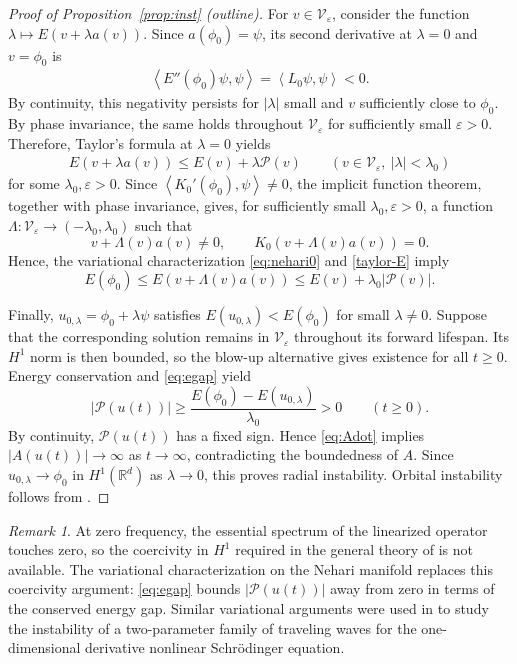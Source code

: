 \documentclass[12pt, a4paper, reqno]{amsart}
\numberwithin{equation}{section}
\theoremstyle{definition}
\theoremstyle{remark}
\newtheorem{remark}[theorem]{Remark}
\newcommand{\R}{\mathbb R}
\def\tbra[#1,#2]{{\left\langle #1,#2\right\rangle}}
\begin{document}
\begin{proof}[Proof of Proposition~\ref{prop:inst} (outline)]
For $v\in\mathcal V_\varepsilon$, consider the function
$\lambda\mapsto E(v+\lambda a(v))$.
Since $a(\phi_0)=\psi$, its second derivative at $\lambda=0$ and
$v=\phi_0$ is
\begin{align*}
\tbra[E''(\phi_0)\psi,\psi]=\tbra[L_0\psi,\psi]<0.
\end{align*}
By continuity, this negativity persists for $|\lambda|$ small and
$v$ sufficiently close to $\phi_0$. By phase invariance, the same
holds throughout $\mathcal V_\varepsilon$ for sufficiently small
$\varepsilon>0$. Therefore, Taylor's formula at $\lambda=0$ yields
\begin{align}
\label{taylor-E}
  E(v+\lambda a(v))
  \le E(v)+\lambda\mathcal P(v)
  \qquad
  (v\in\mathcal V_\varepsilon,\ |\lambda|<\lambda_0)
\end{align}
for some $\lambda_0,\varepsilon>0$.
Since $\tbra[K_0'(\phi_0),\psi]\ne0$, the implicit function theorem,
together with phase invariance, gives, for sufficiently small
$\lambda_0,\varepsilon>0$, a function
$\Lambda\colon\mathcal V_\varepsilon\to(-\lambda_0,\lambda_0)$ such that
\[
  v+\Lambda(v)a(v)\ne0,
  \qquad
  K_0(v+\Lambda(v)a(v))=0.
\]
Hence, the variational characterization \eqref{eq:nehari0} and \eqref{taylor-E} imply
\begin{equation}\label{eq:egap}
  E(\phi_0)
  \le E(v+\Lambda(v)a(v))
  \le E(v)+\lambda_0|\mathcal P(v)|.
\end{equation}

Finally, $u_{0,\lambda}=\phi_0+\lambda\psi$ satisfies
$E(u_{0,\lambda})<E(\phi_0)$ for small $\lambda\ne0$.
Suppose that the corresponding solution remains in
$\mathcal V_\varepsilon$ throughout its forward lifespan.
Its $H^1$ norm is then bounded, so the blow-up alternative gives
existence for all $t\ge0$. Energy conservation and \eqref{eq:egap} yield
\[
  |\mathcal P(u(t))|
  \ge\frac{E(\phi_0)-E(u_{0,\lambda})}{\lambda_0}>0
  \qquad(t\ge0).
\]
By continuity, $\mathcal P(u(t))$ has a fixed sign. Hence
\eqref{eq:Adot} implies $|A(u(t))|\to\infty$ as $t\to\infty$,
contradicting the boundedness of $A$. Since
$u_{0,\lambda}\to\phi_0$ in $H^1(\R^d)$ as $\lambda\to0$, this proves
radial instability. Orbital instability follows from
\cite[Lemma~5.2]{FH25}.
\end{proof}

\begin{remark}
\label{rem:6.2}
At zero frequency, the essential spectrum of the linearized operator
touches zero, so the coercivity in $H^1$ required in the general theory
of \cite{GSS87} is not available. The variational characterization
on the Nehari manifold replaces this coercivity argument:
\eqref{eq:egap} bounds $|\mathcal P(u(t))|$ away from zero in terms of
the conserved energy gap. Similar variational arguments were used in \cite{O14,NOW17} to study the instability of a two-parameter family of traveling waves for the one-dimensional derivative nonlinear Schr\"odinger equation.
\end{remark}
\end{document}
